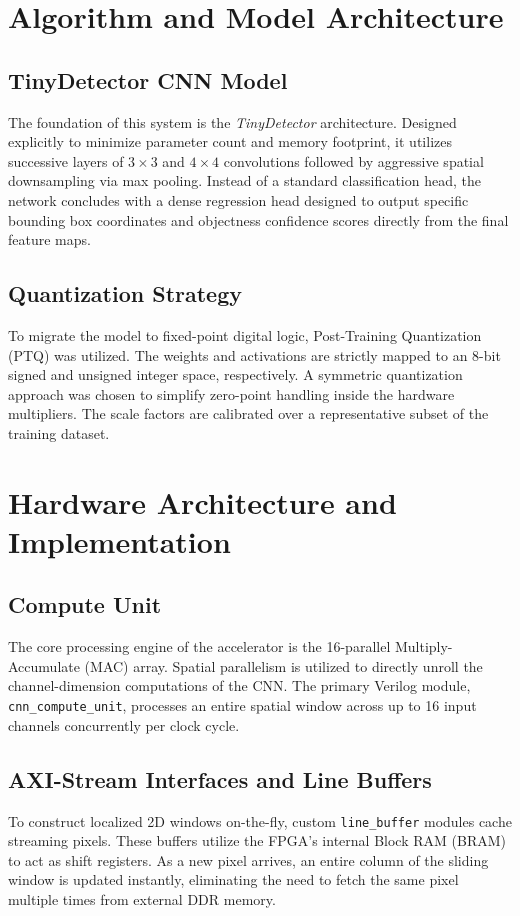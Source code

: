 \documentclass[conference]{IEEEtran}
\begin{document}
\section{Algorithm and Model Architecture}

\subsection{TinyDetector CNN Model}
The foundation of this system is the \textit{TinyDetector} architecture. Designed explicitly to minimize parameter count and memory footprint, it utilizes successive layers of $3\times3$ and $4\times4$ convolutions followed by aggressive spatial downsampling via max pooling. Instead of a standard classification head, the network concludes with a dense regression head designed to output specific bounding box coordinates and objectness confidence scores directly from the final feature maps. 

\subsection{Quantization Strategy}
To migrate the model to fixed-point digital logic, Post-Training Quantization (PTQ) was utilized. The weights and activations are strictly mapped to an 8-bit signed and unsigned integer space, respectively. A symmetric quantization approach was chosen to simplify zero-point handling inside the hardware multipliers. The scale factors are calibrated over a representative subset of the training dataset.

\section{Hardware Architecture and Implementation}

\subsection{Compute Unit}
The core processing engine of the accelerator is the 16-parallel Multiply-Accumulate (MAC) array. Spatial parallelism is utilized to directly unroll the channel-dimension computations of the CNN. The primary Verilog module, \texttt{cnn\_compute\_unit}, processes an entire spatial window across up to 16 input channels concurrently per clock cycle. 

\subsection{AXI-Stream Interfaces and Line Buffers}
To construct localized 2D windows on-the-fly, custom \texttt{line\_buffer} modules cache streaming pixels. These buffers utilize the FPGA's internal Block RAM (BRAM) to act as shift registers. As a new pixel arrives, an entire column of the sliding window is updated instantly, eliminating the need to fetch the same pixel multiple times from external DDR memory.
\end{document}
